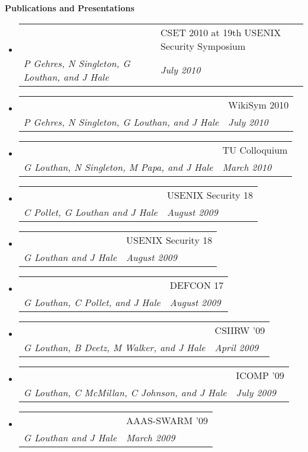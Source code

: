 \documentclass[letterpaper,11pt]{article}
\makeatletter
\newcommand{\resheading}[1]{{\large \colorbox{mygrey}{\begin{minipage}
    {\textwidth}{\textbf{#1 \vphantom{p\^{E}}}}\end{minipage}}}}
\newcommand{\ressubheading}[4]{
\begin{tabular*}{6.5in}[t]{l@{\extracolsep{\fill}}l}
		\textbf{\parbox[t]{4.5in}{\raggedright #1 }} & \parbox[b]{1.5in}{#2} \\
		\textit{#3} & \textit{#4} \\
\end{tabular*}\vspace{-6pt}}
\makeatother
\begin{document}
\resheading{Publications and Presentations}
\begin{itemize}
\item
	\ressubheading{\emph{The Blunderdome: An Offensive Exercise for Building Network, Systems, and Web Security Awareness}\footnotemark[1]}{CSET 2010 at 19th USENIX Security Symposium}{P Gehres, N Singleton, G Louthan, and J Hale}{July 2010}
\item
	\ressubheading{\emph{Toward Sensitive Information Redaction in a Collaborative, Multilevel Security Environment}\footnotemark[1]}{WikiSym 2010}{P Gehres, N Singleton, G Louthan, and J Hale}{July 2010}
\item
	\ressubheading{\emph{Towards Formal Analysis of Cyber-Physical Systems}}{TU Colloquium}{G Louthan, N Singleton, M Papa, and J Hale}{March 2010}
\item
	\ressubheading{\emph{Large-scale Multitouch Interactive Network Visualization} (Poster)}{USENIX Security 18}{C Pollet, G Louthan and J Hale}{August 2009}
\item
	\ressubheading{\emph{SAND: An Architecture for Signature-based Automatic Network Protocol Detection} (Poster)}{USENIX Security 18}{G Louthan and J Hale}{August 2009}
\item
	\ressubheading{\emph{Hack Like the Movie Stars: A Big-Screen Multitouch Network Monitor}}{DEFCON 17}{G Louthan, C Pollet, and J Hale}{August 2009}
\item
	\ressubheading{\emph{Content-based Alternatives to Conventional Network Monitoring}\footnotemark[1]}{CSIIRW '09}{G Louthan, B Deetz, M Walker, and J Hale}{April 2009}
\item
	\ressubheading{\emph{Toward Robust and Extensible Network Protocol Identification}\footnotemark[1]}{ICOMP '09}{G Louthan, C McMillan, C Johnson, and J Hale}{July 2009}
\item
	\ressubheading{\emph{Communication without Boundaries: Breaching the Great Firewall of China}}{AAAS-SWARM '09}{G Louthan and J Hale}{March 2009}
\end{itemize}

\end{document}
